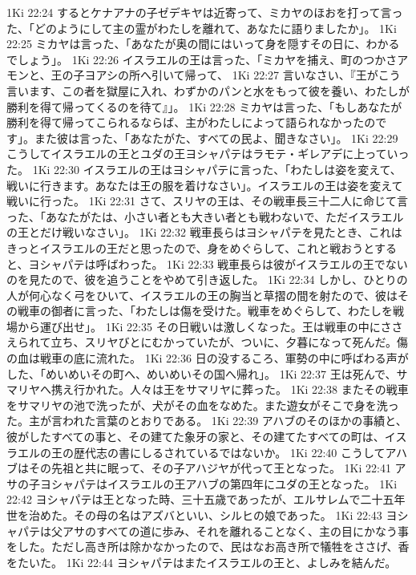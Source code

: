 1Ki 22:24  するとケナアナの子ゼデキヤは近寄って、ミカヤのほおを打って言った、「どのようにして主の霊がわたしを離れて、あなたに語りましたか」。
1Ki 22:25  ミカヤは言った、「あなたが奥の間にはいって身を隠すその日に、わかるでしょう」。
1Ki 22:26  イスラエルの王は言った、「ミカヤを捕え、町のつかさアモンと、王の子ヨアシの所へ引いて帰って、
1Ki 22:27  言いなさい、『王がこう言います、この者を獄屋に入れ、わずかのパンと水をもって彼を養い、わたしが勝利を得て帰ってくるのを待て』」。
1Ki 22:28  ミカヤは言った、「もしあなたが勝利を得て帰ってこられるならば、主がわたしによって語られなかったのです」。また彼は言った、「あなたがた、すべての民よ、聞きなさい」。
1Ki 22:29  こうしてイスラエルの王とユダの王ヨシャパテはラモテ・ギレアデに上っていった。
1Ki 22:30  イスラエルの王はヨシャパテに言った、「わたしは姿を変えて、戦いに行きます。あなたは王の服を着けなさい」。イスラエルの王は姿を変えて戦いに行った。
1Ki 22:31  さて、スリヤの王は、その戦車長三十二人に命じて言った、「あなたがたは、小さい者とも大きい者とも戦わないで、ただイスラエルの王とだけ戦いなさい」。
1Ki 22:32  戦車長らはヨシャパテを見たとき、これはきっとイスラエルの王だと思ったので、身をめぐらして、これと戦おうとすると、ヨシャパテは呼ばわった。
1Ki 22:33  戦車長らは彼がイスラエルの王でないのを見たので、彼を追うことをやめて引き返した。
1Ki 22:34  しかし、ひとりの人が何心なく弓をひいて、イスラエルの王の胸当と草摺の間を射たので、彼はその戦車の御者に言った、「わたしは傷を受けた。戦車をめぐらして、わたしを戦場から運び出せ」。
1Ki 22:35  その日戦いは激しくなった。王は戦車の中にささえられて立ち、スリヤびとにむかっていたが、ついに、夕暮になって死んだ。傷の血は戦車の底に流れた。
1Ki 22:36  日の没するころ、軍勢の中に呼ばわる声がした、「めいめいその町へ、めいめいその国へ帰れ」。
1Ki 22:37  王は死んで、サマリヤへ携え行かれた。人々は王をサマリヤに葬った。
1Ki 22:38  またその戦車をサマリヤの池で洗ったが、犬がその血をなめた。また遊女がそこで身を洗った。主が言われた言葉のとおりである。
1Ki 22:39  アハブのそのほかの事績と、彼がしたすべての事と、その建てた象牙の家と、その建てたすべての町は、イスラエルの王の歴代志の書にしるされているではないか。
1Ki 22:40  こうしてアハブはその先祖と共に眠って、その子アハジヤが代って王となった。
1Ki 22:41  アサの子ヨシャパテはイスラエルの王アハブの第四年にユダの王となった。
1Ki 22:42  ヨシャパテは王となった時、三十五歳であったが、エルサレムで二十五年世を治めた。その母の名はアズバといい、シルヒの娘であった。
1Ki 22:43  ヨシャパテは父アサのすべての道に歩み、それを離れることなく、主の目にかなう事をした。ただし高き所は除かなかったので、民はなお高き所で犠牲をささげ、香をたいた。
1Ki 22:44  ヨシャパテはまたイスラエルの王と、よしみを結んだ。
